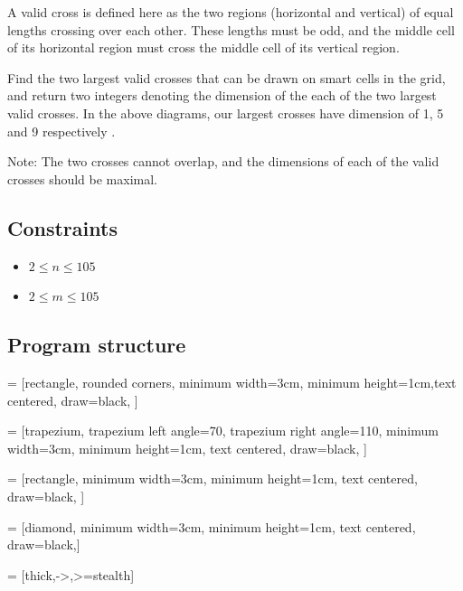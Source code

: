 \documentclass[a4paper,12pt]{article}
\begin{document}
A valid cross is defined here as the two regions (horizontal and vertical) of equal lengths crossing over each other. These lengths must be odd, and the middle cell of its horizontal region must cross the middle cell of its vertical region.

Find the two largest valid crosses that can be drawn on smart cells in the grid, and return two integers denoting the dimension of the each of the two largest valid crosses. In the above diagrams, our largest crosses have dimension of 1,  5 and 9 respectively .

Note: The two crosses cannot overlap, and the dimensions of each of the valid crosses should be maximal.



\subsection*{Constraints}
\begin{itemize}
\item $2 \leqslant n \leqslant 105$
\item $2 \leqslant m \leqslant 105$

\end{itemize}

\subsection{Program structure}


 = [rectangle, rounded corners, minimum width=3cm, minimum height=1cm,text centered, draw=black, ]

 = [trapezium, trapezium left angle=70, trapezium right angle=110, minimum width=3cm, minimum height=1cm, text centered, draw=black, ]

 = [rectangle, minimum width=3cm, minimum height=1cm, text centered, draw=black, ]

 = [diamond, minimum width=3cm, minimum height=1cm, text centered, draw=black,]


 = [thick,->,>=stealth]



\end{document}
